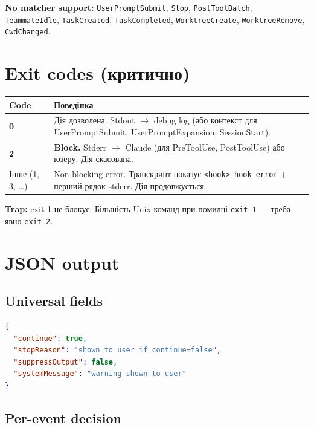 \documentclass[11pt,a4paper]{article}
\begin{document}
\textbf{No matcher support:} \texttt{UserPromptSubmit}, \texttt{Stop}, \texttt{PostToolBatch}, \texttt{TeammateIdle}, \texttt{TaskCreated}, \texttt{TaskCompleted}, \texttt{WorktreeCreate}, \texttt{WorktreeRemove}, \texttt{CwdChanged}.

\section{Exit codes (критично)}

\begin{tabular}{lp{10cm}}
\hline
\textbf{Code} & \textbf{Поведінка} \\
\hline
\textbf{0} & Дія дозволена. Stdout $\to$ debug log (або контекст для UserPromptSubmit, UserPromptExpansion, SessionStart). \\
\textbf{2} & \textbf{Block.} Stderr $\to$ Claude (для PreToolUse, PostToolUse) або юзеру. Дія скасована. \\
Інше (1, 3, \ldots) & Non-blocking error. Транскрипт показує \texttt{<hook> hook error} + перший рядок stderr. Дія продовжується. \\
\hline
\end{tabular}

\textbf{Trap:} exit 1 не блокує. Більшість Unix-команд при помилці \texttt{exit 1} --- треба явно \texttt{exit 2}.

\section{JSON output}

\subsection{Universal fields}

\begin{lstlisting}[language=json]
{
  "continue": true,
  "stopReason": "shown to user if continue=false",
  "suppressOutput": false,
  "systemMessage": "warning shown to user"
}
\end{lstlisting}

\subsection{Per-event decision}
\end{document}
